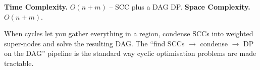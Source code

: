 \begin{complexitybox}
\textbf{Time Complexity.} $O(n+m)$ -- SCC plus a DAG DP. \textbf{Space
Complexity.} $O(n+m)$.
\end{complexitybox}

\begin{takeawaybox}
When cycles let you gather everything in a region, condense SCCs into
weighted super-nodes and solve the resulting DAG. The ``find SCCs $\to$
condense $\to$ DP on the DAG'' pipeline is the standard way cyclic
optimisation problems are made tractable.
\end{takeawaybox}
